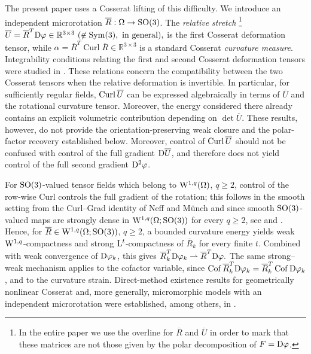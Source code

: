 \documentclass[11pt]{article}
\newcommand{\Curl}{{\rm Curl}}
\DeclareMathOperator{\Cof}{Cof}
\begin{document}
The present paper uses a Cosserat lifting of this difficulty. We introduce an independent microrotation $ \overline R :\Omega\to {\rm SO}(3)$. The {\it relative stretch} \footnote{In the entire paper we use the overline for $ \overline R$ and $ \overline U$ in order to mark that these matrices are not those given by the polar decomposition of $F={\rm D} \varphi$.}
$
 \overline U= \overline R^T{\rm D}\varphi\in \mathbb{R}^{3\times 3}  \  (\not \in {\rm Sym}(3), \ \text{in general}),
$
is the first Cosserat deformation tensor, while
$
\alpha= \overline R^T\operatorname{Curl} \overline R\in \mathbb{R}^{3\times 3}  
$
is a standard Cosserat \cite{Cosserat1896,Cosserat09,Cosserat09b} {\it curvature measure}.  { Integrability conditions relating the first and second Cosserat deformation
tensors were studied in \cite{LankeitNeffOsterbrink2017}. These relations
concern the compatibility between the two Cosserat tensors when the relative
deformation is invertible. In particular, for sufficiently regular fields,
$\Curl \,\overline U$ can be expressed algebraically in terms of $\overline  U$ and the rotational
curvature tensor. Moreover, the energy considered there already contains an
explicit volumetric contribution depending on $\det \overline U$. These results, however, do not provide the orientation-preserving weak
closure and the polar-factor recovery established below. Moreover, control
of $\Curl\, \overline U$ should not be confused with control of the full gradient
${\rm D}\overline U$, and therefore does not yield control of the full second gradient
${\rm D}^2\varphi$.}


For ${\rm SO}(3)$-valued tensor fields which belong to ${\rm W}^{1,q}(\Omega)$, $q\geq 2$, control of the row-wise Curl controls the full gradient of the rotation; this follows in the smooth setting from the Curl--Grad identity of Neff and M\"unch \cite{Neff_curl06} and since  smooth ${\rm SO}(3)$-valued maps are 
strongly dense in
$
{\rm W}^{1,q}(\Omega;{\rm SO}(3))
$
for every \(q\geq 2\), see  \cite{bousquet2017density,detaille2026complete} and \cite{brezis2015density,bethuel1991approximation}. Hence, for $\overline R\in  {\rm W}^{1,q}(\Omega; {\rm SO}(3))$, $q\geq 2$,  a bounded curvature energy yields weak ${\rm W}^{1,q}$-compactness and strong ${\rm L}^t$-compactness of $ \overline R _k$ for every finite $t$. Combined with weak convergence of ${\rm D}\varphi_k$, this gives
$
 \overline  R _k^T{\rm D}\varphi_k\rightharpoonup
  \overline R ^T{\rm D}\varphi.
$
The same strong--weak mechanism applies to the cofactor variable, since $\Cof \overline  R _k^T{\rm D}\varphi_k=\overline  R _k^T\Cof {\rm D}\varphi_k$, and to the
curvature strain. Direct-method existence results for geometrically nonlinear
Cosserat and, more generally,  micromorphic models with an independent microrotation were
established, among others, in
\cite{Neff_Habil04,NeffMicromorphic2006,NeffBirsan13,
neff2014existence,LankeitNeffOsterbrink2017}.
\end{document}
